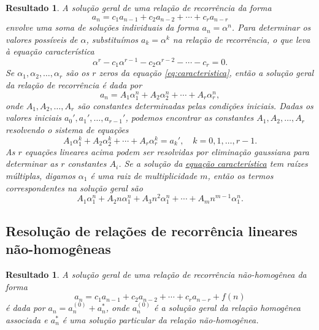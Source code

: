 \documentclass{article}
\theoremstyle{plain}
\newtheorem{res}[thm]{Resultado}
\theoremstyle{definition}
\theoremstyle{remark}
\begin{document}
\begin{res}
    A solução geral de uma relação de recorrência da forma 
    \begin{equation}
        a_n = c_1 a_{n-1} + c_2 a_{n-2} + \cdots + c_r a_{n-r}
    \end{equation}
    \noindent envolve uma soma de soluções individuais da forma \(a_n=\alpha^n\). Para determinar os valores possíveis de \(\alpha\), substituímos \(a_k=\alpha^k\) na relação de recorrência, o que leva à \emph{equação característica}
    \begin{equation}\label{eq:caracteristica}
        \alpha^r - c_1 \alpha^{r-1} - c_2 \alpha^{r-2} - \cdots - c_r = 0.
    \end{equation}
    Se \(\alpha_1, \alpha_2, \ldots, \alpha_r\) são os \(r\) zeros da equação \eqref{eq:caracteristica}, então a solução geral da relação de recorrência é dada por
    \begin{equation}
        a_n = A_1 \alpha_1^n + A_2 \alpha_2^n + \cdots + A_r \alpha_r^n,
    \end{equation}
    \noindent onde \(A_1, A_2, \ldots, A_r\) são constantes determinadas pelas condições iniciais. Dadas os valores iniciais \(a_0', a_1', \ldots, a_{r-1}'\), podemos encontrar as constantes \(A_1, A_2, \ldots, A_r\) resolvendo o sistema de equações
    \begin{equation}
        A_1\alpha_1^k + A_2\alpha_2^k + \cdots + A_r\alpha_r^k = a_k', \quad k=0,1,\ldots,r-1.
    \end{equation}
    As \(r\) equações lineares acima podem ser resolvidas por eliminação gaussiana para determinar as \(r\) constantes \(A_i\). Se a solução da \href{eq:caracteristica}{equação característica} tem raízes múltiplas, digamos \(\alpha_1\) é uma raiz de multiplicidade \(m\), então os termos correspondentes na solução geral são
    \begin{equation}
        A_1 \alpha_1^n + A_2 n \alpha_1^n + A_3 n^2 \alpha_1^n + \cdots + A_m n^{m-1} \alpha_1^n.
    \end{equation}
\end{res}

\subsection{Resolução de relações de recorrência lineares não-homogêneas}

\begin{res}
    A solução geral de uma relação de recorrência não-homogênea da forma
    \begin{equation}\label{eq:nao-homogenea}
        a_n = c_1 a_{n-1} + c_2 a_{n-2} + \cdots + c_r a_{n-r} + f(n)
    \end{equation}
    \noindent é dada por \(a_n = a_n^{(0)} + a^{*}_{n}\), onde \(a_n^{(0)}\) é a solução geral da relação homogênea associada e \(a^{*}_{n}\) é uma solução particular da relação não-homogênea.
\end{res}
\end{document}
